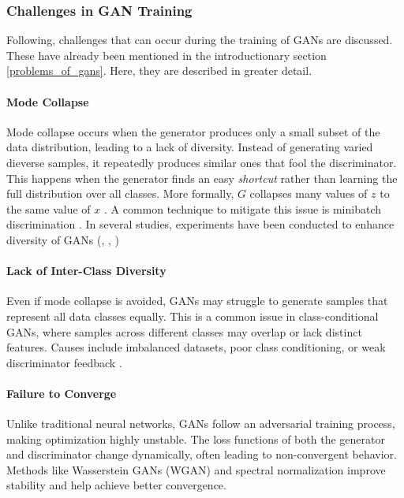 \subsubsection{Challenges in GAN Training}\label{theory_gan_problems}
Following, challenges that can occur during the training of GANs are discussed. These have already been mentioned in the introductionary section \ref{problems_of_gans}. Here, they are described in greater detail.
\paragraph[Mode Collapse]{Mode Collapse}
Mode collapse occurs when the generator produces only a small subset of the data distribution, leading to a lack of diversity. Instead of generating varied dieverse samples, it repeatedly produces similar ones that fool the discriminator. This happens when the generator finds an easy \textit{shortcut} rather than learning the full distribution over all classes. More formally, \(G\) collapses many values of \(z\) to the same value of \(x\) \cite{goodfellow2014generativeadversarialnetworks}. A common technique to mitigate this issue is minibatch discrimination \cite{salimans2016improvedtechniquestraininggans}. In several studies, experiments have been conducted to enhance diversity of GANs (\cite{Chang2024QDGenSampling}, \cite{Humayun2021MaGNET}, \cite{Humayun2022PolaritySampling}) %
\paragraph[Lack of Inter-Class Diversity]{Lack of Inter-Class Diversity}
Even if mode collapse is avoided, GANs may struggle to generate samples that represent all data classes equally. This is a common issue in class-conditional GANs, where samples across different classes may overlap or lack distinct features. Causes include imbalanced datasets, poor class conditioning, or weak discriminator feedback \cite{Odena201710.5555/3305890.3305954}.
\paragraph[Failure to Converge]{Failure to Converge}
Unlike traditional neural networks, GANs follow an adversarial training process, making optimization highly unstable. The loss functions of both the generator and discriminator change dynamically, often leading to non-convergent behavior. Methods like Wasserstein GANs (WGAN) \cite{arjovsky2017wassersteingan} and spectral normalization \cite{miyato2018spectralnormalizationgenerativeadversarial} improve stability and help achieve better convergence.
